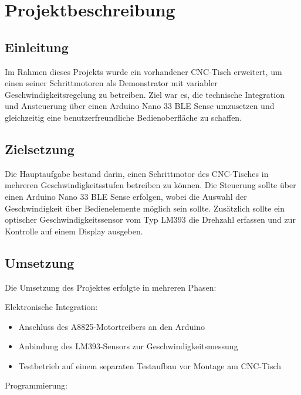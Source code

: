%
%

\chapter{Projektbeschreibung}

\section{Einleitung}

Im Rahmen dieses Projekts wurde ein vorhandener CNC-Tisch erweitert, um einen seiner Schrittmotoren als Demonstrator mit variabler Geschwindigkeitsregelung zu betreiben. Ziel war es, die technische Integration und Ansteuerung über einen Arduino Nano 33 BLE Sense umzusetzen und gleichzeitig eine benutzerfreundliche Bedienoberfläche zu schaffen.

\section{Zielsetzung}

Die Hauptaufgabe bestand darin, einen Schrittmotor des CNC-Tisches in mehreren Geschwindigkeitsstufen betreiben zu können. Die Steuerung sollte über einen Arduino Nano 33 BLE Sense erfolgen, wobei die Auswahl der Geschwindigkeit über Bedienelemente möglich sein sollte. Zusätzlich sollte ein optischer Geschwindigkeitssensor vom Typ LM393 die Drehzahl erfassen und zur Kontrolle auf einem Display ausgeben.

\section{Umsetzung}

Die Umsetzung des Projektes erfolgte in mehreren Phasen:

Elektronische Integration:

\begin{itemize}
	\item Anschluss des A8825-Motortreibers an den Arduino
	\item Anbindung des LM393-Sensors zur Geschwindigkeitsmessung
	\item Testbetrieb auf einem separaten Testaufbau vor Montage am CNC-Tisch
\end{itemize}

Programmierung:

